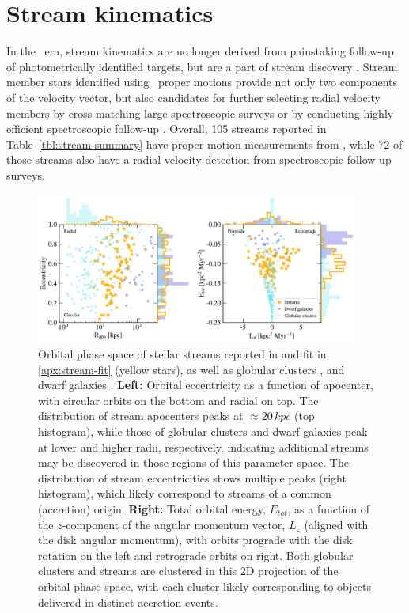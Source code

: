\documentclass[final,5p,times,twocolumn,authoryear]{elsarticle}
\begin{document}
\section{Stream kinematics}
\label{sec:orbits}
In the \gaia\ era, stream kinematics are no longer derived from painstaking follow-up of photometrically identified targets, but are a part of stream discovery \citep[e.g.,][]{malhan:2018b, malhan:2019, ibata:2018, ibata:2019, ibata:2021, grillmair:2019, grillmair:2022}.
Stream member stars identified using \gaia\ proper motions provide not only two components of the velocity vector, but also candidates for further selecting radial velocity members by cross-matching large spectroscopic surveys \citep[e.g.,][]{huang:2019, yang:2022, ibata:2023} or by conducting highly efficient spectroscopic follow-up \citep[e.g.,][]{li:2019, bonaca:2020b}.
Overall, 105 streams reported in Table~\ref{tbl:stream-summary} have proper motion measurements from \gaia, while 72 of those streams also have a radial velocity detection from spectroscopic follow-up surveys.

\begin{figure}
\begin{center}
\includegraphics[width=0.95\textwidth]{figures/orbital_phase_space.pdf}
\end{center}
\caption{%
Orbital phase space of stellar streams reported in \citet{ibata:2023} and fit in \ref{apx:stream-fit} (yellow stars), as well as globular clusters \citep[light blue circles,][]{baumgardt:2019}, and dwarf galaxies \citep[dark blue circles,][]{helmi:2018,simon:2018}.
\textbf{Left:} Orbital eccentricity as a function of apocenter, with circular orbits on the bottom and radial on top.
The distribution of stream apocenters peaks at $\approx20\,\unit{kpc}$ (top histogram), while those of globular clusters and dwarf galaxies peak at lower and higher radii, respectively, indicating additional streams may be discovered in those regions of this parameter space.
The distribution of stream eccentricities shows multiple peaks (right histogram), which likely correspond to streams of a common (accretion) origin.
\textbf{Right:} Total orbital energy, $E_{tot}$, as a function of the $z$-component of the angular momentum vector, $L_z$ (aligned with the disk angular momentum), with orbits prograde with the disk rotation on the left and retrograde orbits on right.
Both globular clusters and streams are clustered in this 2D projection of the orbital phase space, with each cluster likely corresponding to objects delivered in distinct accretion events.
}
\label{fig:phase_space}
\end{figure}
\end{document}
